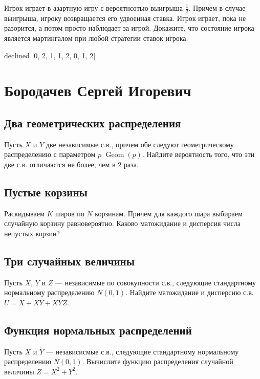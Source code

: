 \documentclass[12pt]{article}
\DeclareMathOperator{\Geom}{Geom}
\begin{document}
Игрок играет в азартную игру с вероятнсотью выигрыша $\frac{1}{2}$. Причем в случае выигрыша, игроку возвращается его удвоенная ставка. Игрок играет, пока не разорится, а потом просто наблюдает за игрой. Докажите, что состояние игрока является мартингалом при любой стратегии ставок игрока.



\newpage
declined  [0, 2, 1, 1, 2, 0, 1, 2]
\section{Бородачев Сергей Игоревич}

\subsection{Два геометрических распределения}

Пусть $X$ и $Y$ две независимые с.в., причем обе следуют геометрическому распределению с параметром $p$ $\Geom(p)$. Найдите вероятность того, что эти две с.в. отличаются не более, чем в 2 раза.



\subsection{Пустые корзины}

Раскидываем $K$ шаров по $N$ корзинам. Причем для каждого шара выбираем случайную корзину равновероятно. Каково матожидание и дисперсия числа непустых корзин?



\subsection{Три случайных величины}

Пусть $X$, $Y$ и $Z$ --- независимые по совокупности с.в., следующие стандартному нормальному распределению $N(0, 1)$. Найдите матожидание и дисперсию с.в. $U = X + XY + XYZ$. 



\subsection{Функция нормальных распределений}

Пусть $X$ и $Y$ --- независисмые с.в., следующие стандартному нормальному распределению $N(0, 1)$. Вычислите функцию распределения случайной величины $Z = X^2 + Y^2$.
\end{document}
